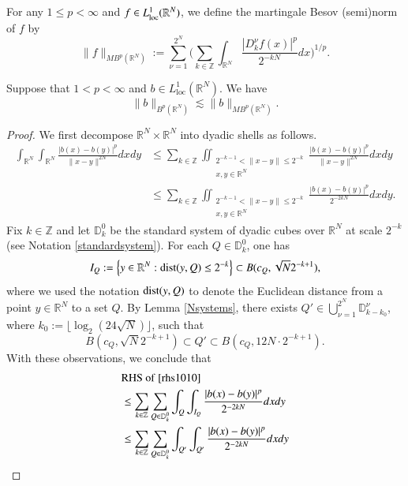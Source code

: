 \documentclass[12pt]{amsart}
\begin{document}
\begin{definition}
For any $1\leq p<\infty$ and $f\in L^1_{\rm loc}(\mathbb{R}^N)$, we define the martingale Besov  (semi)norm of $f$ by
    $$\|f\|_{{MB}^p(\mathbb{R}^N)}:=\sum_{\nu=1}^{2^N}\bigg(\sum_{k\in\mathbb{Z}}\int_{\mathbb{R}^{N}}\frac{|D_k^\nu f(x)|^p}{2^{-kN}}dx\bigg)^{1/p}.$$
\end{definition}

\begin{lemma}\label{MartingaleBesov}
Suppose that $1<p<\infty$ and $b\in L^1_{\mathrm{loc}}(\mathbb{R}^N)$. We have
\[
\|b\|_{B^p(\mathbb{R}^N)}\lesssim \|b\|_{{MB}^p(\mathbb{R}^N)}.
\]
\end{lemma}
\begin{proof}
We first decompose $\mathbb{R}^N\times \mathbb{R}^N$ into dyadic shells as follows.
\begin{align}\label{rhs1010}
  \int_{\mathbb{R}^N}\int_{\mathbb{R}^N}\frac{|b(x)-b(y)|^p}{\|x-y\|^{2N}}dxdy
  &\leq \sum_{k\in\mathbb{Z}}\iint_{\substack{2^{-k-1}<\|x-y\|\leq 2^{-k}\\x,y\in\mathbb{R}^N}}\frac{|b(x)-b(y)|^p}{\|x-y\|^{2N}}dxdy\nonumber\\
  &\leq \sum_{k\in\mathbb{Z}}\iint_{\substack{2^{-k-1}<\|x-y\|\leq 2^{-k}\\x,y\in\mathbb{R}^N}}\frac{|b(x)-b(y)|^p}{2^{-2kN}}dxdy.
\end{align}
Fix $k\in\mathbb{Z}$ and let $\mathbb{D}_k^0$ be the standard system of dyadic cubes over $\mathbb{R}^N$ at scale $2^{-k}$ (see Notation \ref{standardsystem}).
For each $Q\in\mathbb{D}_k^0$, one has
$$I_Q:=\left\{y\in\mathbb{R}^N: {\rm dist}(y,Q)\leq 2^{-k}\right\}\subset B(c_Q,\sqrt{N}2^{-k+1}),$$
where we used the notation ${\rm dist}(y,Q)$ to denote the Euclidean distance from a point $y\in\mathbb{R}^N$ to a set $Q$. By Lemma \ref{Nsystems}, there exists ${\displaystyle Q'\in \bigcup_{\nu=1}^{2^N}\mathbb{D}_{k-k_0}^\nu}$, where $k_0:=\lfloor \log_2(24\sqrt{N})\rfloor$, such that
$$B(c_Q,\sqrt{N}2^{-k+1})\subset Q'\subset B(c_Q,12N\cdot2^{-k+1}).$$
With these observations, we conclude that
\begin{align}\label{RHS1111}
  &{\rm RHS}\ {\rm of}\ \eqref{rhs1010}\nonumber\\
  &\leq \sum_{k\in\mathbb{Z}}\sum_{Q\in\mathbb{D}_k^0}\int_{Q}\int_{I_Q}\frac{|b(x)-b(y)|^p}{2^{-2kN}}dxdy\nonumber\\
   &\leq \sum_{k\in\mathbb{Z}}\sum_{Q\in\mathbb{D}_k^0}\int_{Q'}\int_{Q'}\frac{|b(x)-b(y)|^p}{2^{-2kN}}dxdy\nonumber\\

\end{align}
\end{proof}
\end{document}
